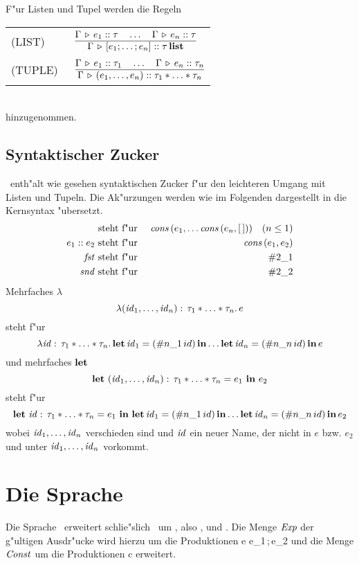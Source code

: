 F"ur Listen und Tupel werden die Regeln\\[3mm]
\begin{tabular}{ll}
  \mbox{(LIST)\ } & $\regel{\Tj{\Gamma}{e_1}{\tau} \quad \ldots \quad \Tj{\Gamma}{e_n}{\tau}}
                           {\Tj{\Gamma}{[e_1;\ldots;e_n]}{\listtype{\tau}}}$ \\[5mm]
  \mbox{(TUPLE)\ }& $\regel{\Tj{\Gamma}{e_1}{\tau_1} \quad \ldots \quad \Tj{\Gamma}{e_n}{\tau_n}}
                           {\Tj{\Gamma}{(e_1,\ldots,e_n)}{\tau_1 * \ldots * \tau_n}}$
\end{tabular}\\[7mm]
hinzugenommen.


\subsection{Syntaktischer Zucker}

\LTHREE\ enth"alt wie gesehen syntaktischen Zucker f"ur den leichteren Umgang mit Listen und Tupeln. Die Ak"urzungen werden
wie im Folgenden dargestellt in die Kernsyntax "ubersetzt.
\begin{eqnarray*}
  [e_1;\ldots;e_n]    & \mbox{ steht f"ur } & \Cons\,(e_1,\ldots \Cons\,(e_n, [\,])) \quad (n \le 1) \\
  e_1 \coloncolon e_2 & \mbox{ steht f"ur } & \Cons\,(e_1, e_2) \\
  \Fst                & \mbox{ steht f"ur } & \#2\_1 \\
  \Snd                & \mbox{ steht f"ur } & \#2\_2
\end{eqnarray*}
Mehrfaches $\lambda$
\[
  \lambda({\text{\it id\/}}_1,\ldots,{\text{\it id\/}}_n):\,\tau_1 * \ldots * \tau_n.\,e
\]
steht f"ur
\[
  \lambda {\text{\it id\/}}:\,\tau_1 * \ldots * \tau_n.\,\textbf{let}\,{\text{\it id\/}}_1 = (\#n\_1\,id)\,\textbf{in} \ldots \textbf{let}\,{\text{\it id\/}}_n = (\#n\_n\,id)\,\textbf{in}\,e
\]
und mehrfaches $\textbf{let}$
\[
  \textbf{let}\ ({\text{\it id\/}}_1,\ldots,{\text{\it id\/}}_n):\,\tau_1 * \ldots * \tau_n = e_1\ \textbf{in}\ e_2
\]
steht f"ur
\[
  \textbf{let}\ {\text{\it id\/}}:\,\tau_1 * \ldots * \tau_n = e_1\ \textbf{in}\ \textbf{let}\,{\text{\it id\/}}_1 = (\#n\_1\,id)\,\textbf{in} \ldots \textbf{let}\,{\text{\it id\/}}_n = (\#n\_n\,id)\,\textbf{in}\,e_2
\]
wobei ${\text{\it id\/}}_1,\ldots,{\text{\it id\/}}_n$ verschieden sind und ${\text{\it id\/}}$ ein neuer Name, der nicht in $e$ bzw. $e_2$ und unter ${\text{\it id\/}}_1,\ldots,{\text{\it id\/}}_n$
vorkommt.



\section{Die Sprache \LFOUR}

Die Sprache \LFOUR\ erweitert schlie"slich \LTHREE\ um , also ,  und
. Die Menge ${\text{\it Exp\/}}$ der g"ultigen Ausdr"ucke wird hierzu um die Produktionen
\bgram
e \is {}
  \al {}
  \al e_1\,;\,e_2
\egram
und die Menge ${\text{\it Const\/}}$ um die Produktionen 
\bgram
c \is \Ref \mid \Deref \mid \Assign
\egram
erweitert.

